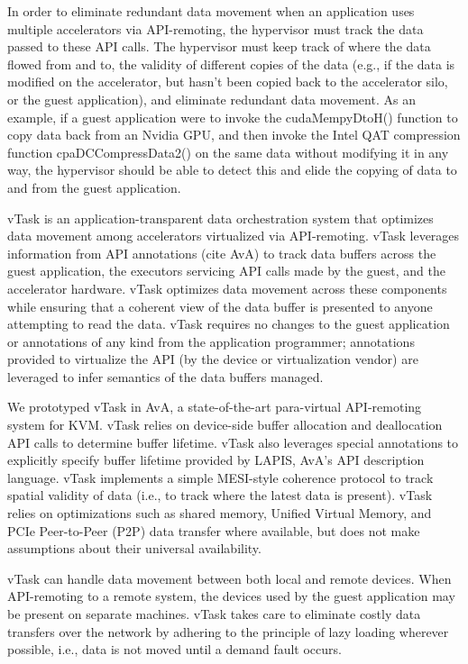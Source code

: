 In order to eliminate redundant data movement when an application uses multiple accelerators via API-remoting, the hypervisor must track the data passed to these API calls. The hypervisor must keep track of where the data flowed from and to, the validity of different copies of the data (e.g., if the data is modified on the accelerator, but hasn’t been copied back to the accelerator silo, or the guest application), and eliminate redundant data movement. As an example, if a guest application were to invoke the cudaMempyDtoH() function to copy data back from an Nvidia GPU, and then invoke the Intel QAT compression function cpaDCCompressData2() on the same data without modifying it in any way, the hypervisor should be able to detect this and elide the copying of data to and from the guest application.

vTask is an application-transparent data orchestration system that optimizes data movement among accelerators virtualized via API-remoting. vTask leverages information from API annotations (cite AvA) to track data buffers across the guest application, the executors servicing API calls made by the guest, and the accelerator hardware. vTask optimizes data movement across these components while ensuring that a coherent view of the data buffer is presented to anyone attempting to read the data. vTask requires no changes to the guest application or annotations of any kind from the application programmer; annotations provided to virtualize the API (by the device or virtualization vendor) are leveraged to infer semantics of the data buffers managed.

We prototyped vTask in AvA, a state-of-the-art para-virtual API-remoting system for KVM. vTask relies on device-side buffer allocation and deallocation API calls to determine buffer lifetime. vTask also leverages special annotations to explicitly specify buffer lifetime provided by LAPIS, AvA’s API description language. vTask implements a simple MESI-style coherence protocol to track spatial validity of data (i.e., to track where the latest data is present). vTask relies on optimizations such as shared memory, Unified Virtual Memory, and PCIe Peer-to-Peer (P2P) data transfer where available, but does not make assumptions about their universal availability.

vTask can handle data movement between both local and remote devices. When API-remoting to a remote system, the devices used by the guest application may be present on separate machines. vTask takes care to eliminate costly data transfers over the network by adhering to the principle of lazy loading wherever possible, i.e., data is not moved until a demand fault occurs.

